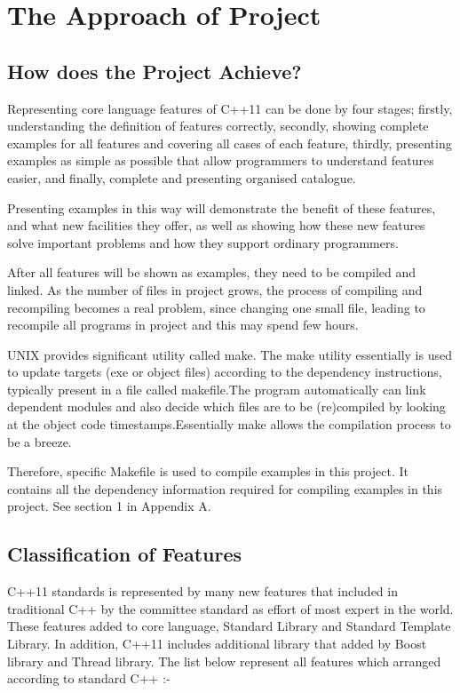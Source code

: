 \documentclass[11pt]{report}
\begin{document}
\chapter{The Approach of Project}
\section{How does the Project Achieve?}
\label{secton: how does the project achieve?}
Representing core language features of C++11 can be done by four stages; firstly, understanding the definition of features correctly, secondly, showing \linebreak complete examples for all features and covering all cases of each feature, thirdly, presenting examples as simple as possible that allow programmers to understand  features easier, and finally, complete and presenting organised catalogue.

Presenting  examples in this way will  demonstrate the benefit of these \linebreak features, and what new facilities they offer, as well as showing how these new features solve important problems and how they support ordinary programmers.

After all features will be shown as examples, they need to be compiled and linked. As the number of files in project grows, the process of compiling and recompiling becomes a real problem, since changing one small file, leading to recompile all programs in project and this may spend few hours.

UNIX provides significant utility called make. The make utility essentially is used to update targets (exe or object files) according to the \linebreak dependency instructions, typically present in a file called makefile.\linebreak The program automatically can link dependent modules and also decide which files are to be (re)compiled by looking at the object code timestamps.\linebreak Essentially make allows the compilation process to be a breeze.

Therefore, specific Makefile is used to compile examples in this project. It contains all the dependency information required for compiling examples in this project. See section 1 in Appendix A.



\section{Classification of Features}
\label{subsection: overview of features}
C++11 standards is represented by many new features that included in \linebreak traditional C++ by the committee standard as effort of most expert in the world. These features added  to core language, Standard Library and Standard Template Library. In addition, C++11 includes additional library that added by Boost library and Thread library. The list below represent all features which arranged according to standard C++ :-
\end{document}
